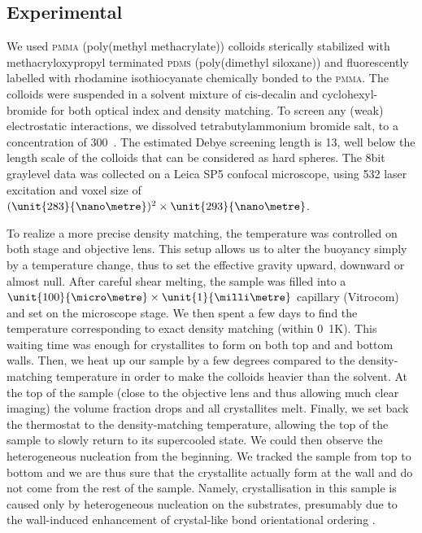 \documentclass[8.5pt,twoside,twocolumn]{article}
\begin{document}
\subsection{Experimental}
We used \textsc{pmma} (poly(methyl methacrylate)) colloids sterically stabilized with methacryloxypropyl terminated \textsc{pdms} (poly(dimethyl siloxane)) and fluorescently labelled with rhodamine isothiocyanate chemically bonded to the \textsc{pmma}. The colloids were suspended in a solvent mixture of cis-decalin and cyclohexyl-bromide for both optical index and density matching. To screen any (weak) electrostatic interactions, we dissolved tetrabutylammonium bromide salt, to a concentration of \unit{300}{\nano\mole\per\liter}~\citep{royall2005}. The estimated Debye screening length is \unit{13}{\nano\metre}, well below the length scale of the colloids that can be considered as hard spheres. The \unit{8}{bit} graylevel data was collected on a Leica SP5 confocal microscope, using \unit{532}{\nano\meter} laser excitation and voxel size of $(\unit{283}{\nano\metre})^2\times\unit{293}{\nano\metre}$.

To realize a more precise density matching, the temperature was controlled on both stage and objective lens. This setup allows us to alter the buoyancy simply by a temperature change, thus to set the effective gravity upward, downward or almost null. After careful shear melting, the sample was filled into a $\unit{100}{\micro\metre}\times\unit{1}{\milli\metre}$ capillary (Vitrocom) and set on the microscope stage. We then spent a few days to find the temperature corresponding to exact density matching (within \unit{0.1}{K}). This waiting time was enough for crystallites to form on both top and and bottom walls. Then, we heat up our sample by a few degrees compared to the density-matching temperature in order to make the colloids heavier than the solvent. At the top of the sample (close to the objective lens and thus allowing much clear imaging) the volume fraction drops and all crystallites melt. Finally, we set back the thermostat to the density-matching temperature, allowing the top of the sample to slowly return to its supercooled state. We could then observe the heterogeneous nucleation from the beginning. We tracked the sample from top to bottom and we are thus sure that the crystallite actually form at the wall and do not come from the rest of the sample. Namely, crystallisation in this sample is caused only by heterogeneous nucleation on the substrates, presumably due to the wall-induced 
enhancement of crystal-like bond orientational ordering \cite{watanabe2011}.  
\end{document}
